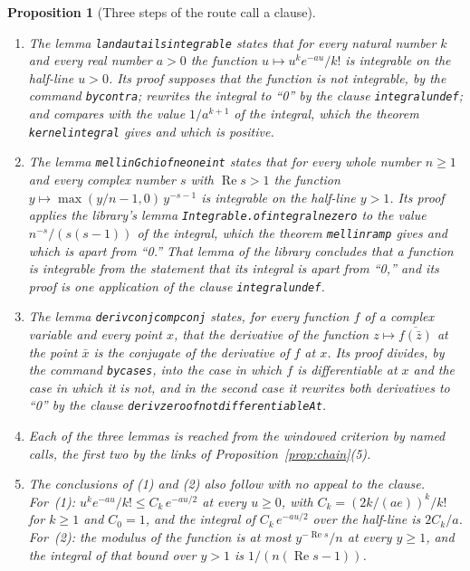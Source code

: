 \documentclass[11pt]{article}
\newtheorem{proposition}[theorem]{Proposition}
\theoremstyle{definition}
\theoremstyle{remark}
\newcommand{\re}{\operatorname{Re}}
\DeclareRobustCommand{\lean}[1]{{\renewcommand{\_}{\textunderscore\allowbreak}\texttt{#1}}}
\begin{document}
\begin{proposition}[Three steps of the route call a clause]\label{prop:clausesteps}
\leavevmode
\begin{enumerate}[leftmargin=2em,itemsep=1pt]
\item The lemma \lean{landau\_tails\_integrable} states that for every natural number $k$ and every real number $a>0$ the function $u\mapsto u^{k}e^{-au}/k!$ is integrable on the half-line $u>0$. Its proof supposes that the function is not integrable, by the command \lean{by\_contra}; rewrites the integral to ``0'' by the clause \lean{integral\_undef}; and compares with the value $1/a^{k+1}$ of the integral, which the theorem \lean{kernel\_integral} gives and which is positive.
\item The lemma \lean{mellin\_Gchi\_of\_ne\_one\_int} states that for every whole number $n\ge1$ and every complex number $s$ with $\re s>1$ the function $y\mapsto\max(y/n-1,0)\,y^{-s-1}$ is integrable on the half-line $y>1$. Its proof applies the library's lemma \lean{Integrable.of\_integral\_ne\_zero} to the value $n^{-s}/(s(s-1))$ of the integral, which the theorem \lean{mellin\_ramp} gives and which is apart from ``0.'' That lemma of the library concludes that a function is integrable from the statement that its integral is apart from ``0,'' and its proof is one application of the clause \lean{integral\_undef}.
\item The lemma \lean{deriv\_conj\_comp\_conj} states, for every function $f$ of a complex variable and every point $x$, that the derivative of the function $z\mapsto\overline{f(\bar z)}$ at the point $\bar x$ is the conjugate of the derivative of $f$ at $x$. Its proof divides, by the command \lean{by\_cases}, into the case in which $f$ is differentiable at $x$ and the case in which it is not, and in the second case it rewrites both derivatives to ``0'' by the clause \lean{deriv\_zero\_of\_not\_differentiableAt}.
\item Each of the three lemmas is reached from the windowed criterion by named calls, the first two by the links of Proposition~\ref{prop:chain}(5).
\item The conclusions of (1) and (2) also follow with no appeal to the clause. For~(1): $u^{k}e^{-au}/k!\le C_k\,e^{-au/2}$ at every $u\ge0$, with $C_k=(2k/(ae))^{k}/k!$ for $k\ge1$ and $C_0=1$, and the integral of $C_k\,e^{-au/2}$ over the half-line is $2C_k/a$. For~(2): the modulus of the function is at most $y^{-\re s}/n$ at every $y\ge1$, and the integral of that bound over $y>1$ is $1/(n(\re s-1))$.
\end{enumerate}
\end{proposition}
\end{document}
